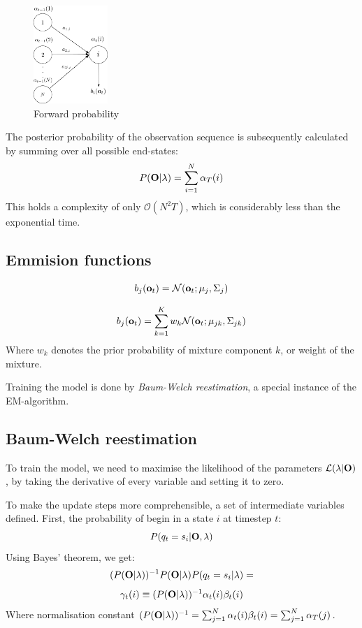 \documentclass[conference]{IEEEtran}
\begin{document}
\begin{figure}[H]
\centering
\includegraphics[width=0.25\textwidth]{forward2.jpg}
 \caption{Forward probability}
\end{figure}
The posterior probability of the observation sequence is subsequently calculated by summing over all possible end-states:
\begin{equation}
 P({\bf O}|\lambda) = \displaystyle \sum_{i = 1}^{N} \alpha_{T}(i)
\end{equation}
This holds a complexity of only $\mathcal{O}(N^{2}T)$, which is considerably less than the exponential time.
\subsection{Emmision functions}
\begin{equation}
\label{GausProbability}
 b_{j}({\bf o}_{t}) = \mathcal{N}({\bf o}_{t}; \mu_{j}, \Sigma_{j})
\end{equation}

\begin{equation}
\label{MOGprobability}
 b_{j}({\bf o}_{t}) = \displaystyle \sum_{k = 1}^K w_{k} \mathcal{N}({\bf o}_{t}; \mu_{jk}, \Sigma_{jk})
\end{equation}
Where $w_{k}$ denotes the prior probability of mixture component $k$, or weight of the mixture. 

Training the model is done by {\it Baum-Welch reestimation}, a special instance of the EM-algorithm.
\subsection{Baum-Welch reestimation}

To train the model, we need to maximise the likelihood of the parameters $\mathcal{L}(\lambda|{\bf O})$, by taking the derivative of every variable and setting it to zero.

To make the update steps more comprehensible, a set of intermediate variables defined. First, the probability of begin in a state $i$ at timestep $t$:
\[
 P(q_{t} = s_{i} | {\bf O}, \lambda )
\]
Using Bayes' theorem, we get:
\[
 (P({\bf O}|\lambda))^{-1} P({\bf O}|\lambda )P(q_{t} = s_{i}|\lambda) = 
\]
\begin{equation}
 \gamma_{t}(i) \equiv (P({\bf O}|\lambda))^{-1} \alpha_{t}(i)\beta_{t}(i) 
\end{equation}
Where normalisation constant $(P({\bf O}|\lambda))^{-1} = \sum_{j=1}^{N} \alpha_{t}(i)\beta_{t}(i) = \sum_{j=1}^{N} \alpha_{T}(j)$.
\end{document}
